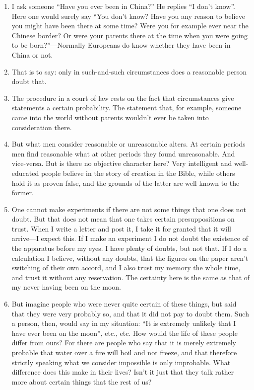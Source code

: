 \documentclass{book}
\begin{document}
\begin{enumerate}
\item
I ask someone ``Have you ever been in China?'' He replies ``I don't know''.
Here one would surely say ``You don't know? Have you any reason to believe you
might have been there at some time? Were you for example ever near the Chinese
border? Or were your parents there at the time when you were going to be
born?''---Normally Europeans do know whether they have been in China or not.

\item
That is to say: only in such-and-such circumstances does a reasonable person
doubt that.

\item
The procedure in a court of law rests on the fact that circumstances give
statements a certain probability. The statement that, for example, someone came
into the world without parents wouldn't ever be taken into consideration there.

\item
But what men consider reasonable or unreasonable alters. At certain periods men
find reasonable what at other periods they found unreasonable. And vice-versa.
But is there no objective character here?  Very intelligent and well-educated
people believe in the story of creation in the Bible, while others hold it as
proven false, and the grounds of the latter are well known to the former.

\item
One cannot make experiments if there are not some things that one does not
doubt. But that does not mean that one takes certain presuppositions on trust.
When I write a letter and post it, I take it for granted that it will
arrive---I expect this.  If I make an experiment I do not doubt the existence
of the apparatus before my eyes. I have plenty of doubts, but not that. If I do
a calculation I believe, without any doubts, that the figures on the paper
aren't switching of their own accord, and I also trust my memory the whole
time, and trust it without any reservation. The certainty here is the same as
that of my never having been on the moon.

\item
But imagine people who were never quite certain of these things, but said that
they were very probably so, and that it did not pay to doubt them. Such a
person, then, would say in my situation: ``It is extremely unlikely that I have
ever been on the moon'', etc., etc. How would the life of these people differ
from ours? For there are people who say that it is merely extremely probable
that water over a fire will boil and not freeze, and that therefore strictly
speaking what we consider impossible is only improbable. What difference does
this make in their lives? Isn't it just that they talk rather more about
certain things that the rest of us?


\end{enumerate}
\end{document}
